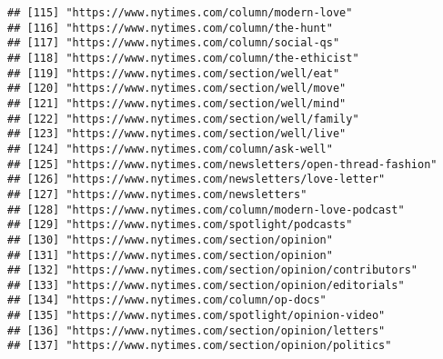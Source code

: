 \documentclass[
]{article}
\begin{document}
\begin{verbatim}
## [115] "https://www.nytimes.com/column/modern-love"                                                                
## [116] "https://www.nytimes.com/column/the-hunt"                                                                   
## [117] "https://www.nytimes.com/column/social-qs"                                                                  
## [118] "https://www.nytimes.com/column/the-ethicist"                                                               
## [119] "https://www.nytimes.com/section/well/eat"                                                                  
## [120] "https://www.nytimes.com/section/well/move"                                                                 
## [121] "https://www.nytimes.com/section/well/mind"                                                                 
## [122] "https://www.nytimes.com/section/well/family"                                                               
## [123] "https://www.nytimes.com/section/well/live"                                                                 
## [124] "https://www.nytimes.com/column/ask-well"                                                                   
## [125] "https://www.nytimes.com/newsletters/open-thread-fashion"                                                   
## [126] "https://www.nytimes.com/newsletters/love-letter"                                                           
## [127] "https://www.nytimes.com/newsletters"                                                                       
## [128] "https://www.nytimes.com/column/modern-love-podcast"                                                        
## [129] "https://www.nytimes.com/spotlight/podcasts"                                                                
## [130] "https://www.nytimes.com/section/opinion"                                                                   
## [131] "https://www.nytimes.com/section/opinion"                                                                   
## [132] "https://www.nytimes.com/section/opinion/contributors"                                                      
## [133] "https://www.nytimes.com/section/opinion/editorials"                                                        
## [134] "https://www.nytimes.com/column/op-docs"                                                                    
## [135] "https://www.nytimes.com/spotlight/opinion-video"                                                           
## [136] "https://www.nytimes.com/section/opinion/letters"                                                           
## [137] "https://www.nytimes.com/section/opinion/politics"                                                          

\end{verbatim}
\end{document}
